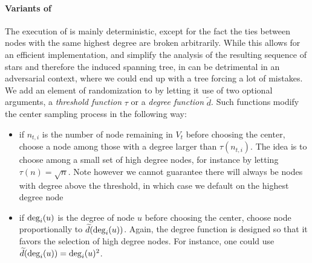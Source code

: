\paragraph{Variants of \extractStar{}}
\label{ssec:gtx_center_choice}

The execution of \extractStar{} is mainly deterministic, except for the fact the ties between nodes
with the same highest degree are broken arbitrarily. While this allows for an efficient
implementation, and simplify the analysis of the resulting sequence of stars and therefore the
induced spanning tree, in can be detrimental in an adversarial context, where we could end up with a
tree forcing a lot of mistakes. We add an element of randomization to \extractStar{} by letting it
use of two optional arguments, a \emph{threshold function} $\tau$ or a \emph{degree function}
$\widetilde{d}$. Such functions modify the center sampling process in the following way:
\begin{itemize}%
  \item if $n_{t,i}$ is the number of node remaining in $V_t$ before choosing the \ith{} center, choose
    a node \uar{} among those with a degree larger than $\tau(n_{t,i})$. The idea is to choose
    among a small set of high degree nodes, for instance by letting $\tau(n) = \sqrt{n}$. Note
    however we cannot guarantee there will always be nodes with degree above the threshold, in which
    case we default on the highest degree node
  \item if $\operatorname{deg}_i(u)$ is the degree of node $u$ before choosing the \ith{} center, choose node
    proportionally to $\widetilde{d}(\operatorname{deg}_i(u))$. Again, the degree function is designed so that it
    favors the selection of high degree nodes. For instance, one could use
    $\widetilde{d}(\operatorname{deg}_i(u)) = \operatorname{deg}_i(u)^2$.
\end{itemize}

